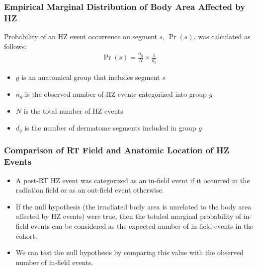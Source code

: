 \documentclass[aspectratio=169, 12pt]{beamer}
\begin{document}
	\begin{frame}
	\frametitle{Empirical Marginal Distribution of Body Area Affected by HZ}
	Probability of an HZ event occurrence on segment $s$, $\Pr(s)$, was calculated as follows:
	\begin{eqnarray*}
	\Pr(s) = \frac{n_g}{N} \times \frac{1}{d_g}
	\end{eqnarray*}
	\begin{itemize}
	\item $g$ is an anatomical group that includes segment $s$
	\item $n_g$ is the observed number of HZ events categorized into group $g$
	\item $N$ is the total number of HZ events
	\item $d_g$ is the number of dermatome segments included in group $g$

	\end{itemize}
	\end{frame}

	\begin{frame}
	\end{frame}

	\begin{frame}
	\frametitle{Comparison of RT Field and Anatomic Location of HZ Events}
	\begin{itemize}
	\item A post-RT HZ event was categorized as an in-field event if it occurred in the radiation field or as an out-field event otherwise.
	\item If the null hypothesis (the irradiated body area is unrelated to the body area affected by HZ events) were true, then the totaled marginal probability of in-field events can be considered as the expected number of in-field events in the cohort.
	\item We can test the null hypothesis by comparing this value with the observed number of in-field events.

	\end{itemize}
	\end{frame}
\end{document}

